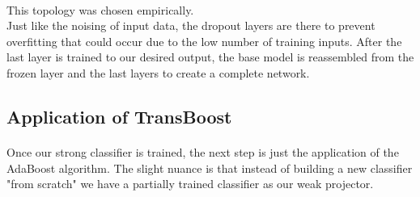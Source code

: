 \documentclass[11 pt]{article}
\begin{document}
\medskip

\paragraph{}This topology was chosen empirically.\\

Just like the noising of input data, the dropout layers are there to prevent overfitting that could occur due to the low number of training inputs. 
After the last layer is trained to our desired output, the base model is reassembled from the frozen layer and the last layers to create a complete network.


\subsection{Application of TransBoost}

\paragraph{} Once our strong classifier is trained, the next step is just the application of the AdaBoost algorithm. The slight nuance is that instead of building a new classifier "from scratch" we have a partially trained classifier as our weak projector. 
\end{document}

